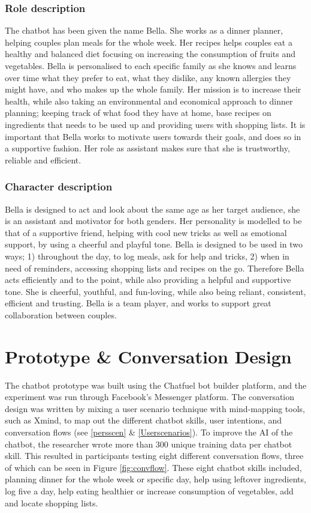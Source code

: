     \subsubsection{Role description}
    The chatbot has been given the name Bella. She works as a dinner planner, helping couples plan meals for the whole week. Her recipes helps couples eat a healthy and balanced diet focusing on increasing the consumption of fruits and vegetables. Bella is personalised to each specific family as she knows and learns over time what they prefer to eat, what they dislike, any known allergies they might have, and who makes up the whole family. Her mission is to increase their health, while also taking an environmental and economical approach to dinner planning; keeping track of what food they have at home, base recipes on ingredients that needs to be used up and providing users with shopping lists. It is important that Bella works to motivate users towards their goals, and does so in a supportive fashion. Her role as assistant makes sure that she is trustworthy, reliable and efficient.
    
    \subsubsection{Character description}
    Bella is designed to act and look about the same age as her target audience, she is an assistant and motivator for both genders. Her personality is modelled to be that of a supportive friend, helping with cool new tricks as well as emotional support, by using a cheerful and playful tone. Bella is designed to be used in two ways; 1) throughout the day, to log meals, ask for help and tricks, 2) when in need of reminders, accessing shopping lists and recipes on the go. Therefore Bella acts efficiently and to the point, while also providing a helpful and supportive tone. She is cheerful, youthful, and fun-loving, while also being reliant, consistent, efficient and trusting. Bella is a team player, and works to support great collaboration between couples. 

\vspace{5mm}

\section{Prototype \& Conversation Design}
The chatbot prototype was built using the Chatfuel bot builder platform, and the experiment was run through Facebook's Messenger platform. The conversation design was written by mixing a user scenario technique with mind-mapping tools, such as Xmind, to map out the different chatbot skills, user intentions, and conversation flows (see \ref{persscen} \& \ref{Userscenarios}). To improve the AI of the chatbot, the researcher wrote more than 300 unique training data per chatbot skill. This resulted in participants testing eight different conversation flows, three of which can be seen in Figure \ref{fig:convflow}. These eight chatbot skills included, planning dinner for the whole week or specific day, help using leftover ingredients, log five a day, help eating healthier or increase consumption of vegetables, add and locate shopping lists.
    
